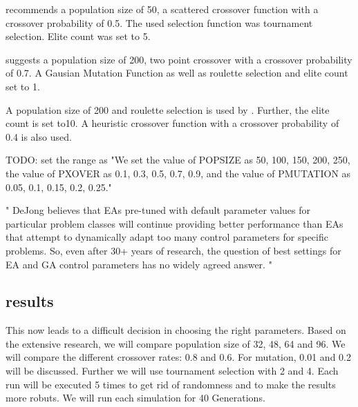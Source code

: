 \cite{fazal_estimating_2005} recommends a population size of 50, a scattered crossover function with a crossover probability of 0.5. The used selection function was tournament selection. Elite count was set to 5.

\cite{dao_maximising_2016} suggests a population size of 200, two point crossover with a crossover probability of 0.7. A Gausian Mutation Function as well as roulette selection and elite count set to 1.

A population size of 200 and roulette selection is used by \cite{assistant_professor_amity_university_jaipur_rajasthan_india_parameter_2019}. Further, the elite count is set to10. A heuristic crossover function with a crossover probability of 0.4 is also used.


TODO: \cite{jinghui_zhong_comparison_2005}  set the range as "We set the value of POPSIZE as 50, 100, 150, 200, 250, the value of PXOVER as 0.1, 0.3, 0.5, 0.7, 0.9, and the value of PMUTATION as 0.05, 0.1, 0.15, 0.2, 0.25."

"
DeJong believes that EAs pre-tuned with default parameter values for particular problem classes will continue providing better performance than EAs that attempt to dynamically adapt too many control parameters for specific problems. So, even after 30+ years of research, the question of best settings for EA and GA control parameters has no widely agreed answer.
"\cite{mills_determining_2015}


\subsection{results}
This now leads to a difficult decision in choosing the right parameters. Based on the extensive research, we will compare population size of 32, 48, 64 and 96. We will compare the different crossover rates: 0.8 and 0.6. For mutation, 0.01 and 0.2 will be discussed. Further we will use tournament selection with 2 and 4.
Each run will be executed 5 times to get rid of randomness and to make the results more robuts. We will run each simulation for 40 Generations.

